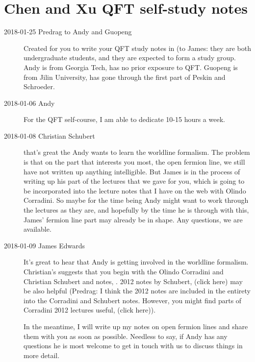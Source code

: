 \section{Chen and Xu QFT self-study notes}
\label{c-dailyBlogAC}

\begin{description}

\item[2018-01-25  Predrag to Andy and Guopeng]
    Created  for you to write your QFT study notes
    in (to James: they are both undergraduate students, and they are
    expected to form a study group. Andy is from Georgia Tech, has no
    prior exposure to QFT. Guopeng is from Jilin University, has gone
    through the first part of Peskin and Schroeder.

\item[2018-01-06 Andy]
For the QFT self-course, I am able to dedicate 10-15 hours a week.

\item[2018-01-08 Christian Schubert]
that's great the Andy wants to learn the worldline formalism. The problem
is that on the part that interests you most, the open fermion line, we
still have not written up anything intelligible. But James is in
the process of writing up his part of the lectures that we gave for you,
which is going to be incorporated into the lecture notes that I have on
the web with Olindo Corradini. So maybe for the time being Andy might
want to work through the lectures as they are, and hopefully by the time
he is through with this, James' fermion line part may already be in shape.
Any questions, we are available.

\item[2018-01-09 James Edwards ]
It's great to hear that Andy is getting involved in the worldline
formalism. Christian's suggests that you begin with the Olindo Corradini
and Christian Schubert and
 notes, . 2012 notes by
Schubert,
{(click here)} may be also helpful
(Predrag: I think the 2012 notes are included in the entirety into the
Corradini and Schubert  notes. However, you might find parts of
Corradini 2012 lectures useful,
{(click here)}).

In the meantime, I will write up my notes on open fermion lines and share
them with you as soon as possible. Needless to say, if Andy has any
questions he is most welcome to get in touch with us to discuss things in
more detail.


\end{description}
